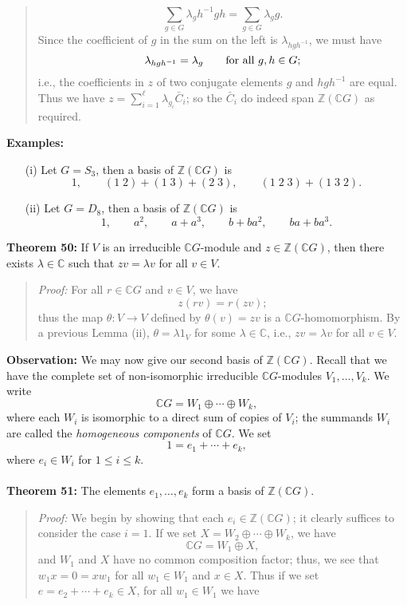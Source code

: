 {\begin{quote}
$$\sum_{g\in G}\lambda_gh^{-1}gh=\sum_{g\in G}\lambda_gg.$$
Since the coefficient of $g$ in the sum on the left is $\lambda_{hgh^{-1}}$,
we must have
$$\lambda_{hgh^{-1}}=\lambda_g\qquad\hbox{for all }g,h\in G;$$
i.e., the coefficients in $z$ of two conjugate elements $g$ and $hgh^{-1}$ are
equal. Thus we have $z=\sum_{i=1}^\ell\lambda_{g_i}\bar C_i$; so the
$\bar C_i$ do indeed span ${\mathbb Z}({\mathbb C}G)$ as required.
\end{quote}
{\bf Examples:}
\begin{itemize}
\item[(i)] Let $G=S_3$, then a basis of ${\mathbb Z}({\mathbb C}G)$ is
$$1,\qquad(1\;2)+(1\;3)+(2\;3),\qquad(1\;2\;3)+(1\;3\;2).$$
\item[(ii)] Let $G=D_8$, then a basis of ${\mathbb Z}({\mathbb C}G)$ is
$$1,\qquad a^2,\qquad a+a^3,\qquad b+ba^2,\qquad ba+ba^3.$$
\end{itemize}
{\bf Theorem 50:} If $V$ is an irreducible ${\mathbb C}G$-module
and $z\in {\mathbb Z}({\mathbb C}G)$, then there exists $\lambda\in{\mathbb C}$ such that
$zv=\lambda v$ for all $v\in V$.
\begin{quote}
\emph{Proof:}
For all $r\in{\mathbb C}G$ and $v\in V$, we have
$$z(rv)=r(zv);$$
thus the map $\theta:V\rightarrow V$ defined by $\theta(v)=zv$ is a
${\mathbb C}G$-homomorphism. By a previous Lemma (ii), $\theta=\lambda1_V$ for some
$\lambda\in{\mathbb C}$, i.e., $zv=\lambda v$ for all $v\in V$.
\end{quote}
{\bf Observation:}
We may now give our second basis of ${\mathbb Z}({\mathbb C}G)$.
Recall that we have the complete set of non-isomorphic
irreducible ${\mathbb C}G$-modules $V_1,\dots,V_k$. We write
$${\mathbb C}G=W_1\oplus\cdots\oplus W_k,$$
where each $W_i$ is isomorphic to a direct sum of copies of $V_i$; the summands
$W_i$ are called the \emph{homogeneous components} of ${\mathbb C}G$. We set
$$1=e_1+\cdots+e_k,$$
where $e_i\in W_i$ for $1\leq i\leq k$.
\\
\\
{\bf Theorem 51:} The elements $e_1,\dots,e_k$ form a basis
of ${\mathbb Z}({\mathbb C}G)$.
\begin{quote}
\emph{Proof:}
We begin by showing that each $e_i\in {\mathbb Z}({\mathbb C}G)$; it clearly suffices to
consider the case $i=1$. If we set $X=W_2\oplus\cdots\oplus W_k$, we have
$${\mathbb C}G=W_1\oplus X,$$
and $W_1$ and $X$ have no common composition factor; thus,
we see that $w_1x=0=xw_1$ for all $w_1\in W_1$ and $x\in X$.
Thus if we set $e=e_2+\cdots+e_k\in X$, for all $w_1\in W_1$ we have

\end{quote}}
